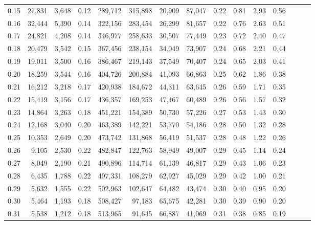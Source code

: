 \begin{tabular}{rrrrrrrrrrrrrrr}
0.15 &  27,831 &  3,648 &  0.12 &  289,712 &  315,898 &   20,909 &   87,047 &  0.22 &  0.81 &  2.93 &      0.56 \\
0.16 &  32,444 &  5,390 &  0.14 &  322,156 &  283,454 &   26,299 &   81,657 &  0.22 &  0.76 &  2.63 &      0.51 \\
0.17 &  24,821 &  4,208 &  0.14 &  346,977 &  258,633 &   30,507 &   77,449 &  0.23 &  0.72 &  2.40 &      0.47 \\
0.18 &  20,479 &  3,542 &  0.15 &  367,456 &  238,154 &   34,049 &   73,907 &  0.24 &  0.68 &  2.21 &      0.44 \\
0.19 &  19,011 &  3,500 &  0.16 &  386,467 &  219,143 &   37,549 &   70,407 &  0.24 &  0.65 &  2.03 &      0.41 \\
0.20 &  18,259 &  3,544 &  0.16 &  404,726 &  200,884 &   41,093 &   66,863 &  0.25 &  0.62 &  1.86 &      0.38 \\
0.21 &  16,212 &  3,218 &  0.17 &  420,938 &  184,672 &   44,311 &   63,645 &  0.26 &  0.59 &  1.71 &      0.35 \\
0.22 &  15,419 &  3,156 &  0.17 &  436,357 &  169,253 &   47,467 &   60,489 &  0.26 &  0.56 &  1.57 &      0.32 \\
0.23 &  14,864 &  3,263 &  0.18 &  451,221 &  154,389 &   50,730 &   57,226 &  0.27 &  0.53 &  1.43 &      0.30 \\
0.24 &  12,168 &  3,040 &  0.20 &  463,389 &  142,221 &   53,770 &   54,186 &  0.28 &  0.50 &  1.32 &      0.28 \\
0.25 &  10,353 &  2,649 &  0.20 &  473,742 &  131,868 &   56,419 &   51,537 &  0.28 &  0.48 &  1.22 &      0.26 \\
0.26 &   9,105 &  2,530 &  0.22 &  482,847 &  122,763 &   58,949 &   49,007 &  0.29 &  0.45 &  1.14 &      0.24 \\
0.27 &   8,049 &  2,190 &  0.21 &  490,896 &  114,714 &   61,139 &   46,817 &  0.29 &  0.43 &  1.06 &      0.23 \\
0.28 &   6,435 &  1,788 &  0.22 &  497,331 &  108,279 &   62,927 &   45,029 &  0.29 &  0.42 &  1.00 &      0.21 \\
0.29 &   5,632 &  1,555 &  0.22 &  502,963 &  102,647 &   64,482 &   43,474 &  0.30 &  0.40 &  0.95 &      0.20 \\
0.30 &   5,464 &  1,193 &  0.18 &  508,427 &   97,183 &   65,675 &   42,281 &  0.30 &  0.39 &  0.90 &      0.20 \\
0.31 &   5,538 &  1,212 &  0.18 &  513,965 &   91,645 &   66,887 &   41,069 &  0.31 &  0.38 &  0.85 &      0.19 \\

\end{tabular}
